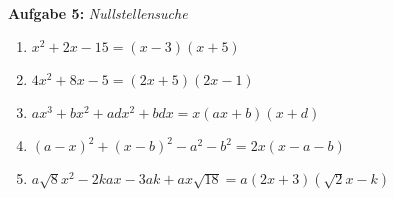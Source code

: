 %
\\$~$\\[5mm]
%
\textbf{Aufgabe 5: } \emph{Nullstellensuche}
\begin{enumerate}[label=(\alph*)]
\item $x^2+2x-15=(x-3)(x+5)$
\item $4x^2+8x-5=(2x+5)(2x-1)$
\item $ax^3+bx^2+adx^2+bdx=x(ax+b)(x+d)$
\item $(a-x)^2+(x-b)^2-a^2-b^2=2x(x-a-b)$
\item $a\sqrt{8}x^2-2kax-3ak+ax\sqrt{18}=a(2x+3)(\sqrt{2}x-k)$
\end{enumerate}